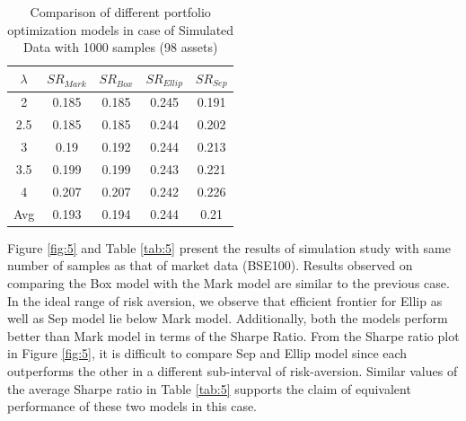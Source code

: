 \begin{table}[!h]
    \centering
    \captionsetup{justification=centering}
   \begin{tabular}{||c|c|c|c|c||}
   \hline
  
  
  $\lambda$ & $SR_{Mark}$ & $SR_{Box}$ & $SR_{Ellip}$ & $SR_{Sep}$ \\
  
  \hline
 2 & 0.185 & 0.185 & 0.245 & 0.191 \\
 2.5 & 0.185 & 0.185 & 0.244 & 0.202 \\
 3 & 0.19 & 0.192 & 0.244 & 0.213 \\
 3.5 & 0.199 & 0.199 & 0.243 & 0.221 \\
 4 & 0.207 & 0.207 & 0.242 & 0.226 \\
  \hline
  Avg & 0.193 & 0.194 & 0.244 & 0.21 \\
  \hline

\end{tabular}
    \caption{Comparison of different portfolio optimization models in case of Simulated Data with 1000 samples (98 assets)}
    \label{tab:4}
\end{table}

Figure \ref{fig:5} and Table \ref{tab:5} present the results of simulation study with same number of samples as that of market data (BSE100). Results observed on comparing the Box model with the Mark model are similar to the previous case.  In the ideal range of risk aversion, we observe that efficient frontier for Ellip as well as Sep model lie below Mark model. Additionally, both the models perform better than Mark model in terms of the Sharpe Ratio. From the Sharpe ratio plot in Figure \ref{fig:5}, it is difficult to compare Sep and Ellip model since each outperforms the other in a different sub-interval of risk-aversion. Similar values of the average Sharpe ratio in Table \ref{tab:5} supports the claim of equivalent performance of these two models in this case.

